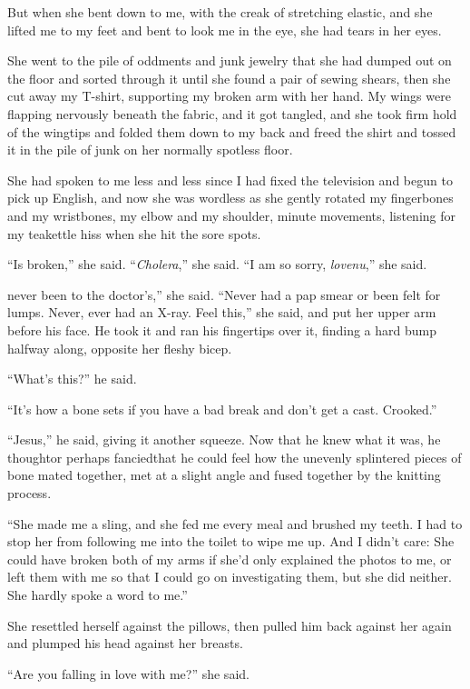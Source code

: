 But when she bent down to me, with the creak of stretching elastic,
and she lifted me to my feet and bent to look me in the eye, she had
tears in her eyes.

She went to the pile of oddments and junk jewelry that she had dumped
out on the floor and sorted through it until she found a pair of
sewing shears, then she cut away my T-shirt, supporting my broken arm
with her hand.  My wings were flapping nervously beneath the fabric,
and it got tangled, and she took firm hold of the wingtips and folded
them down to my back and freed the shirt and tossed it in the pile of
junk on her normally spotless floor.

She had spoken to me less and less since I had fixed the television
and begun to pick up English, and now she was wordless as she gently
rotated my fingerbones and my wristbones, my elbow and my shoulder,
minute movements, listening for my teakettle hiss when she hit the
sore spots.

``Is broken,'' she said.  ``\textit{Cholera},'' she said.  ``I am so
sorry, \textit{lovenu},'' she said.

never been to the doctor's,'' she said.  ``Never had a pap
smear or been felt for lumps.  Never, ever had an X-ray.  Feel this,''
she said, and put her upper arm before his face.  He took it and ran
his fingertips over it, finding a hard bump halfway along, opposite
her fleshy bicep.

``What's this?'' he said.

``It's how a bone sets if you have a bad break and don't get a cast. 
Crooked.''

``Jesus,'' he said, giving it another squeeze.  Now that he knew what
it was, he thought\dash{}or perhaps fancied\dash{}that he could feel how the
unevenly splintered pieces of bone mated together, met at a slight
angle and fused together by the knitting process.

``She made me a sling, and she fed me every meal and brushed my teeth. 
I had to stop her from following me into the toilet to wipe me up. 
And I didn't care:  She could have broken both of my arms if she'd
only explained the photos to me, or left them with me so that I could
go on investigating them, but she did neither.  She hardly spoke a
word to me.''

She resettled herself against the pillows, then pulled him back
against her again and plumped his head against her breasts.

``Are you falling in love with me?'' she said.

